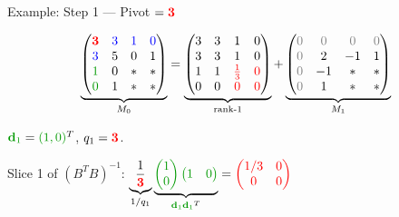 \documentclass[10pt]{beamer}
\theoremstyle{definition}
\newcommand{\pvt}[1]{{\color{red}\mathbf{#1}}}       %
\newcommand{\crs}[1]{{\color{blue}#1}}                %
\newcommand{\gn}[1]{{\color{green!60!black}#1}}       %
\newcommand{\rd}[1]{{\color{red}#1}}                  %
\newcommand{\gz}{{\color{gray}0}}                      %
\begin{document}
\begin{frame}{Example: Step 1 — Pivot $= \pvt{3}$}

$$\underbrace{\begin{pmatrix} \pvt{3} & \crs{3} & \crs{1} & \crs{0} \\ \crs{3} & 5 & 0 & 1 \\ \gn{1} & 0 & * & * \\ \gn{0} & 1 & * & * \end{pmatrix}}_{M_0}
= \underbrace{\begin{pmatrix} 3 & 3 & 1 & 0 \\ 3 & 3 & 1 & 0 \\ 1 & 1 & \rd{\tfrac{1}{3}} & \rd{0} \\ 0 & 0 & \rd{0} & \rd{0} \end{pmatrix}}_{\text{rank-1}}
+ \underbrace{\begin{pmatrix} \gz & \gz & \gz & \gz \\ \gz & 2 & -1 & 1 \\ \gz & -1 & * & * \\ \gz & 1 & * & * \end{pmatrix}}_{M_1}$$

\vspace{0.3em}

$\gn{\mathbf{d}_1} = \gn{(1, 0)}^T$, \; $q_1 = \pvt{3}$.

\vspace{0.2em}

Slice 1 of $(B^TB)^{-1}$: \; $\underbrace{\dfrac{1}{\pvt{3}}}_{1/q_1}\underbrace{\gn{\begin{pmatrix}1\\0\end{pmatrix}\begin{pmatrix}1&0\end{pmatrix}}}_{\gn{\mathbf{d}_1}\gn{\mathbf{d}_1}^T} = \rd{\begin{pmatrix} 1/3 & 0 \\ 0 & 0 \end{pmatrix}}$

\end{frame}
\end{document}
